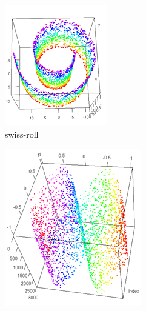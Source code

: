 \documentclass[twoside,twocolumn]{article}
\begin{document}
\begin{figure}[ht!]
   \begin{minipage}[c]{0.45\linewidth}
      \centering \includegraphics[width=\textwidth]{swisroll.png}
   \\swiss-roll
   \end{minipage}\hfill
   \begin{minipage}[c]{0.45\linewidth}   
      \centering \includegraphics[width=\textwidth]{twinpearks.png}

\end{minipage}
\end{figure}
\end{document}

